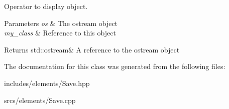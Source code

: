 Operator to display object. 


\begin{DoxyParams}{Parameters}
{\em os} & The ostream object \\
\hline
{\em my\+\_\+class} & Reference to \textquotesingle{}this\textquotesingle{} object \\
\hline
\end{DoxyParams}
\begin{DoxyReturn}{Returns}
std\+::ostream\& A reference to the ostream object 
\end{DoxyReturn}


The documentation for this class was generated from the following files\+:\begin{DoxyCompactItemize}
\item 
includes/elements/Save.\+hpp\item 
srcs/elements/Save.\+cpp\end{DoxyCompactItemize}
